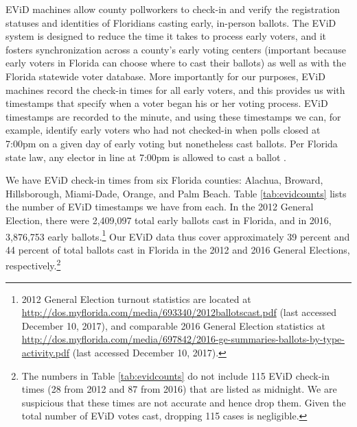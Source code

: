 \documentclass[12pt,titlepage]{article}
\begin{document}

EViD machines allow county pollworkers to check-in and verify the
registration statuses and identities of Floridians casting early,
in-person ballots. The EViD system is designed to reduce the time it
takes to process early voters, and it fosters synchronization across a
county's early voting centers (important because early voters in
Florida can choose where to cast their ballots) as well as with the
Florida statewide voter database.  More importantly for our purposes,
EViD machines record the check-in times for all early voters, and this
provides us with timestamps that specify when a voter began his or her
voting process. EViD timestamps are recorded to the minute, and using
these timestamps we can, for example, identify early voters who had
not checked-in when polls closed at 7:00pm on a given day of early
voting but nonetheless cast ballots.  Per Florida state law, any
elector in line at 7:00pm is allowed to cast a ballot
\citet{FLStatutes:7pm}.

We have EViD check-in times from six Florida counties: Alachua,
Broward, Hillsborough, Miami-Dade, Orange, and Palm Beach.  Table
\ref{tab:evidcounts} lists the number of EViD timestamps we have from
each.  In the 2012 General Election, there were 2,409,097 total early
ballots cast in Florida, and in 2016, 3,876,753 early
ballots.\footnote{2012 General Election turnout statistics are located
  at \url{http://dos.myflorida.com/media/693340/2012ballotscast.pdf}
  (last accessed December 10, 2017), and comparable 2016 General
  Election statistics at
  \url{http://dos.myflorida.com/media/697842/2016-ge-summaries-ballots-by-type-activity.pdf}
  (last accessed December 10, 2017).}  Our EViD data thus cover
approximately 39 percent and 44 percent of total ballots cast in
Florida in the 2012 and 2016 General Elections,
respectively.\footnote{The numbers in Table \ref{tab:evidcounts} do
  not include 115 EViD check-in times (28 from 2012 and 87 from 2016)
  that are listed as midnight.  We are suspicious that these times are
  not accurate and hence drop them.  Given the total number of EViD
  votes cast, dropping 115 cases is negligible.\label{fn:midnight}}




\end{document}
